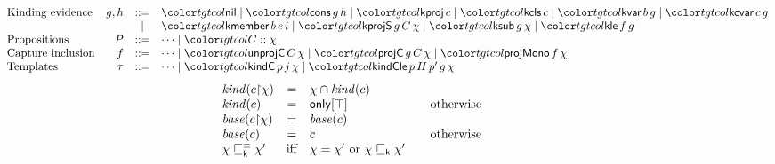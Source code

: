 \begin{figure}[tp]
\footnotesize
\color{tgtcol}
\[
\begin{array}{@{}lrcl@{}}
\text{Kinding evidence} & g, h & ::= & \ev{nil} \mid \ev{cons}\,g\,h \mid \ev{kproj}\,c \mid \ev{kcls}\,c \mid \ev{kvar}\,b\,g \mid \ev{kcvar}\,c\,g \\
& & \mid & \ev{kmember}\,b\,e\,i \mid \ev{kprojS}\,g\,C\,\chi \mid \ev{ksub}\,g\,\chi \mid \ev{kle}\,f\,g \\
\text{Propositions} & P & ::= & \cdots \mid \pkind{C}{\chi} \\
\text{Capture inclusion} & f & ::= & \cdots \mid \ev{unprojC}\,C\,\chi \mid \ev{projC}\,g\,C\,\chi \mid \ev{projMono}\,f\,\chi \\
\text{Templates} & \tau & ::= & \cdots \mid \ev{kindC}\,p\,j\,\chi \mid \ev{kindCle}\,p\,H\,p'\,g\,\chi
\end{array}
\]
\[
\begin{array}{@{}lcl@{\qquad}l@{}}
\kindof{\restr{c}{\chi}} & = & \chi \cap \kindof{c} \\
\kindof{c} & = & \konly{\top} & \text{otherwise} \\
\baseof{\restr{c}{\chi}} & = & \baseof{c} \\
\baseof{c} & = & c & \text{otherwise} \\
\admstep{\chi}{\chi'} & \text{iff} & \chi = \chi' \text{ or } \subkind{\chi}{\chi'}
\end{array}
\]
\end{figure}
